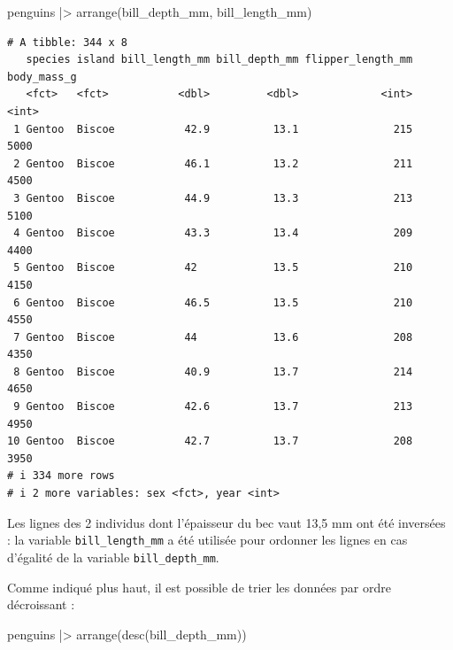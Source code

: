 \documentclass[
  a4paper,
  DIV=11,
  numbers=noendperiod,
  oneside]{scrreprt}
\newenvironment{Shaded}{}{}
\newcommand{\FunctionTok}[1]{\textcolor[rgb]{0.44,0.26,0.76}{#1}}
\newcommand{\NormalTok}[1]{\textcolor[rgb]{0.14,0.16,0.18}{#1}}
\newcommand{\SpecialCharTok}[1]{\textcolor[rgb]{0.00,0.36,0.77}{#1}}
\begin{document}
\begin{Shaded}
\begin{Highlighting}[]
\NormalTok{penguins }\SpecialCharTok{|\textgreater{}}
  \FunctionTok{arrange}\NormalTok{(bill\_depth\_mm, bill\_length\_mm)}
\end{Highlighting}
\end{Shaded}

\begin{verbatim}
# A tibble: 344 x 8
   species island bill_length_mm bill_depth_mm flipper_length_mm body_mass_g
   <fct>   <fct>           <dbl>         <dbl>             <int>       <int>
 1 Gentoo  Biscoe           42.9          13.1               215        5000
 2 Gentoo  Biscoe           46.1          13.2               211        4500
 3 Gentoo  Biscoe           44.9          13.3               213        5100
 4 Gentoo  Biscoe           43.3          13.4               209        4400
 5 Gentoo  Biscoe           42            13.5               210        4150
 6 Gentoo  Biscoe           46.5          13.5               210        4550
 7 Gentoo  Biscoe           44            13.6               208        4350
 8 Gentoo  Biscoe           40.9          13.7               214        4650
 9 Gentoo  Biscoe           42.6          13.7               213        4950
10 Gentoo  Biscoe           42.7          13.7               208        3950
# i 334 more rows
# i 2 more variables: sex <fct>, year <int>
\end{verbatim}

Les lignes des 2 individus dont l'épaisseur du bec vaut 13,5 mm ont été
inversées : la variable \texttt{bill\_length\_mm} a été utilisée pour
ordonner les lignes en cas d'égalité de la variable
\texttt{bill\_depth\_mm}.

Comme indiqué plus haut, il est possible de trier les données par ordre
décroissant :

\begin{Shaded}
\begin{Highlighting}[]
\NormalTok{penguins }\SpecialCharTok{|\textgreater{}}
  \FunctionTok{arrange}\NormalTok{(}\FunctionTok{desc}\NormalTok{(bill\_depth\_mm))}
\end{Highlighting}
\end{Shaded}
\end{document}
